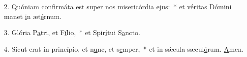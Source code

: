 2. Quóniam confirmáta est super nos miseric\uline{ó}rdia \uline{e}jus:~* et véritas Dómini manet \uline{i}n æt\uline{é}rnum.\par 
3. Glória P\uline{a}tri, et F\uline{í}lio,~* et Spir\uline{í}tui S\uline{a}ncto.\par 
4. Sicut erat in princípio, et n\uline{u}nc, et s\uline{e}mper,~* et in sǽcula sæcul\uline{ó}rum. \uline{A}men.\par 
